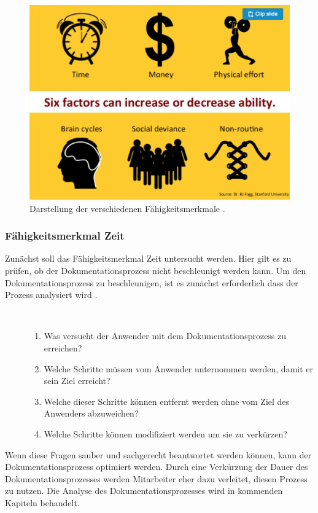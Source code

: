\documentclass[a4paper,12pt,twoside]{scrartcl}
\begin{document}
\begin{figure}[h!]
\begin{center}
\includegraphics[scale = 0.4]{Bilder/Faehigkeitenfaktoren.eps}
\caption{Darstellung der verschiedenen Fähigkeitsmerkmale \cite{Merkmale2018}.}
\label{FähigkeitsmerkmaleBild}
\end{center}
\end{figure}
\subsubsection{Fähigkeitsmerkmal Zeit}
Zunächst soll das Fähigkeitsmerkmal Zeit untersucht werden. Hier gilt es zu prüfen, ob der Dokumentationsprozess nicht beschleunigt werden kann. Um den Dokumentationsprozess zu beschleunigen, ist es zunächst erforderlich dass der Prozess analysiert wird \cite{Hauptly2008}.\\
\begin{description}
   \item[\parbox{\textwidth}{Um den Dokumentationsprozess sachgemäß zu analysieren müssen die Folgenden Fragen beantwortet werden: \normalfont\vspace{0.5ex}}]~\par
   \begin{enumerate}
      \item Was versucht der Anwender mit dem Dokumentationsprozess zu erreichen?
      \item Welche Schritte müssen vom Anwender unternommen werden, damit er sein Ziel erreicht?
      \item Welche dieser Schritte können entfernt werden ohne vom Ziel des Anwenders abzuweichen?
      \item Welche Schritte können modifiziert werden um sie zu verkürzen?
   \end{enumerate}
\end{description}
Wenn diese Fragen sauber und sachgerecht beantwortet werden können, kann der Dokumentationsprozess optimiert werden. Durch eine Verkürzung der Dauer des Dokumentationsprozesses werden Mitarbeiter eher dazu verleitet, diesen Prozess zu nutzen. Die Analyse des Dokumentationsprozesses wird in kommenden Kapiteln behandelt.
\end{document}
